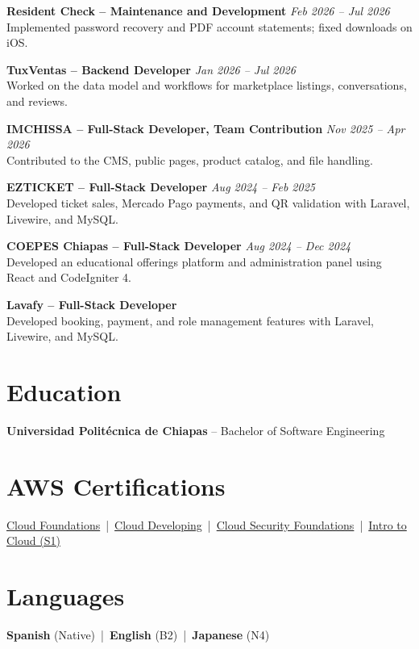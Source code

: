 \textbf{Resident Check -- Maintenance and Development} \hfill \textit{Feb 2026 -- Jul 2026}\\
Implemented password recovery and PDF account statements; fixed downloads on iOS.

\textbf{TuxVentas -- Backend Developer} \hfill \textit{Jan 2026 -- Jul 2026}\\
Worked on the data model and workflows for marketplace listings, conversations, and reviews.

\textbf{IMCHISSA -- Full-Stack Developer, Team Contribution} \hfill \textit{Nov 2025 -- Apr 2026}\\
Contributed to the CMS, public pages, product catalog, and file handling.

\textbf{EZTICKET -- Full-Stack Developer} \hfill \textit{Aug 2024 -- Feb 2025}\\
Developed ticket sales, Mercado Pago payments, and QR validation with Laravel, Livewire, and MySQL.

\textbf{COEPES Chiapas -- Full-Stack Developer} \hfill \textit{Aug 2024 -- Dec 2024}\\
Developed an educational offerings platform and administration panel using React and CodeIgniter 4.

\textbf{Lavafy -- Full-Stack Developer}\\
Developed booking, payment, and role management features with Laravel, Livewire, and MySQL.

\section{Education}
\textbf{Universidad Polit\'ecnica de Chiapas} -- Bachelor of Software Engineering

\section{AWS Certifications}
\href{https://www.credly.com/badges/17c50411-0cbe-4586-bd34-00c130c92e22/public_url}{\faCertificate\; Cloud Foundations} \,|\,
\href{https://www.credly.com/badges/920866d4-e314-469b-87d3-b4da8c069864/public_url}{\faCertificate\; Cloud Developing} \,|\,
\href{https://www.credly.com/badges/dbcfcfd3-7d99-4877-b777-1489e1edf8d5/public_url}{\faCertificate\; Cloud Security Foundations} \,|\,
\href{https://www.credly.com/badges/657cf76c-0b10-40ba-a55d-62f35c764ac2/public_url}{\faCertificate\; Intro to Cloud (S1)}

\section{Languages}
\textbf{Spanish} (Native) \,|\, \textbf{English} (B2) \,|\, \textbf{Japanese} (N4)
